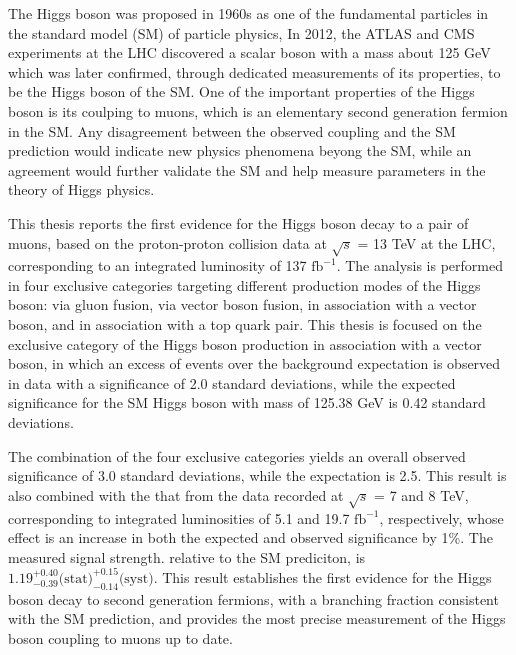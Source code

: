 The Higgs boson was proposed in 1960s as one of the fundamental particles in the standard model (SM) of particle physics,
In 2012, the ATLAS and CMS experiments at the LHC discovered a scalar boson with a mass about 125 GeV 
which was later confirmed, through dedicated measurements of its properties, to be the Higgs boson of the SM.
One of the important properties of the Higgs boson is its coulping to muons, 
which is an elementary second generation fermion in the SM.
Any disagreement between the observed coupling and the SM prediction would indicate new physics phenomena beyong the SM,
while an agreement would further validate the SM and help measure parameters in the theory of Higgs physics.

This thesis reports the first evidence for the Higgs boson decay to a pair of muons,
based on the proton-proton collision data at $\sqrt{s}$ = 13 TeV at the LHC, 
corresponding to an integrated luminosity of 137 $\text{fb}^{-1}$.
The analysis is performed in four exclusive categories targeting different production modes of the Higgs boson:
via gluon fusion, via vector boson fusion, in association with a vector boson, and in association with a top quark pair.
This thesis is focused on the exclusive category of the Higgs boson production in association with a vector boson,
in which an excess of events over the background expectation is observed in data with a significance of 2.0 standard deviations,
while the expected significance for the SM Higgs boson with mass of 125.38 GeV is 0.42 standard deviations.

The combination of the four exclusive categories yields an overall observed significance of 3.0 standard deviations, while the expectation is 2.5.
This result is also combined with the that from the data recorded at $\sqrt{s}$ = 7 and 8 TeV, 
corresponding to integrated luminosities of 5.1 and 19.7 $\text{fb}^{-1}$, respectively,
whose effect is an increase in both the expected and observed significance by 1\%.
The measured signal strength. relative to the SM prediciton, is $1.19^{+0.40}_{-0.39} \text{(stat)}^{+0.15}_{-0.14} \text{(syst)}$.
This result establishes the first evidence for the Higgs boson decay to second generation fermions, with a branching fraction consistent with the SM prediction, 
and provides the most precise measurement of the Higgs boson coupling to muons up to date.